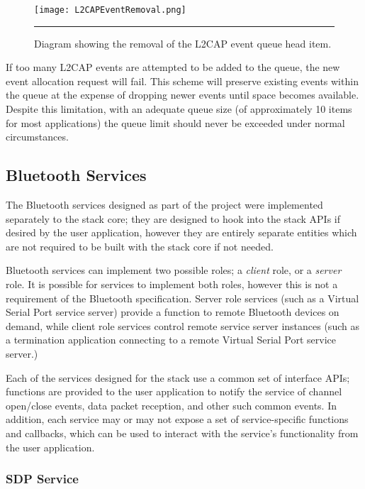 \begin{figure}[tbph]
	\vspace{1em}
	\centering
		\texttt{[image: L2CAPEventRemoval.png]}
	\rule{35em}{0.5pt}
	\caption[L2CAP Event Object Queue Removal]{Diagram showing the removal of the L2CAP event queue head item.}
	\label{fig:l2capeventremoval}
\end{figure}

If too many L2CAP events are attempted to be added to the queue, the new event allocation request will fail. This scheme will preserve existing events within the queue at the expense of dropping newer events until space becomes available. Despite this limitation, with an adequate queue size (of approximately 10 items for most applications) the queue limit should never be exceeded under normal circumstances.

\FloatBarrier
\subsection{Bluetooth Services}

The Bluetooth services designed as part of the project were implemented separately to the stack core; they are designed to hook into the stack APIs if desired by the user application, however they are entirely separate entities which are not required to be built with the stack core if not needed.

Bluetooth services can implement two possible roles; a \textit{client} role, or a \textit{server} role. It is possible for services to implement both roles, however this is not a requirement of the Bluetooth specification. Server role services (such as a Virtual Serial Port service server) provide a function to remote Bluetooth devices on demand, while client role services control remote service server instances (such as a termination application connecting to a remote Virtual Serial Port service server.)

Each of the services designed for the stack use a common set of interface APIs; functions are provided to the user application to notify the service of channel open/close events, data packet reception, and other such common events. In addition, each service may or may not expose a set of service-specific functions and callbacks, which can be used to interact with the service's functionality from the user application.

\FloatBarrier
\subsubsection{SDP Service}

